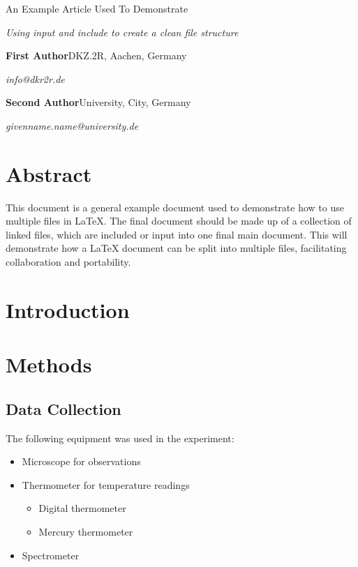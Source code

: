 \documentclass{article}
\newcommand{\authorinfo}[3]{
  \noindent\textbf{#1}\hfill #2\par
  \noindent\textit{#3}\par\vspace{0.5em}}
\begin{document}
\begin{titlepage}

\begin{Huge}
    An Example Article Used To Demonstrate
\end{Huge}

\textit{Using input and include to create a clean file structure}

\vfill

\authorinfo{First Author}{DKZ.2R, Aachen, Germany}{info@dkr2r.de}

\authorinfo{Second Author}{University, City, Germany}{givenname.name@university.de}

\end{titlepage}

\section*{Abstract}
This document is a general example document used to demonstrate how to use multiple files in LaTeX.
The final document should be made up of a collection of linked files, which are included or input into one final main document.
This will demonstrate how a LaTeX document can be split into multiple files, facilitating collaboration and portability.

\section{Introduction}

\lipsum[1-2]

\section{Methods}

\lipsum[3]

\subsection{Data Collection}

\lipsum[4]

The following equipment was used in the experiment:

\begin{itemize}[label=\arabic*.]
	\item Microscope for observations
	\item Thermometer for temperature readings
	\begin{itemize}[label=\arabic*.\arabic*]
		\item Digital thermometer
		\item Mercury thermometer
	\end{itemize}
	\item Spectrometer
\end{itemize}
\end{document}
